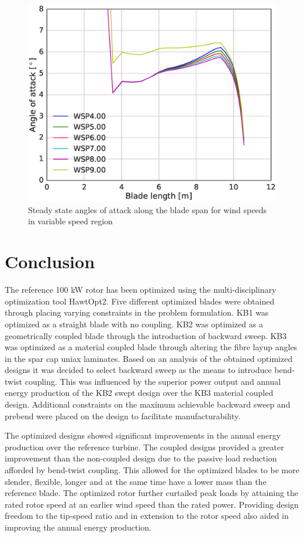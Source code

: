
\begin{figure}[tph]
\centering
\includegraphics[width=0.8\linewidth]{figures/KB6_final/KB5_AoA_WSP_HS2.eps}
\caption{Steady state angles of attack along the blade span for wind speeds in variable speed region}
\label{fig:KB5_aoa}
\end{figure}

\section{Conclusion}
\label{sec:optimize_conc}
The reference 100 kW rotor has been optimized using the multi-disciplinary optimization tool HawtOpt2. Five different optimized blades were obtained through placing varying constraints in the problem formulation. KB1 was optimized as a straight blade with no coupling. KB2 was optimized as a geometrically coupled blade through the introduction of backward sweep. KB3 was optimized as a material coupled blade through altering the fibre layup angles in the spar cap uniax laminates. Based on an analysis of the obtained optimized designs it was decided to select backward sweep as the means to introduce bend-twist coupling. This was influenced by the superior power output and annual energy production of the KB2 swept design over the KB3 material coupled design. Additional constraints on the maximum achievable backward sweep and prebend were placed on the design to facilitate manufacturability.  

The optimized designs showed significant improvements in the annual energy production over the reference turbine. The coupled designs provided a greater improvement than the non-coupled design due to the passive load reduction afforded by bend-twist coupling. This allowed for the optimized blades to be more slender, flexible, longer and at the same time have a lower mass than the reference blade. The optimized rotor further curtailed peak loads by attaining the rated rotor speed at an earlier wind speed than the rated power. Providing design freedom to the tip-speed ratio and in extension to the rotor speed also aided in improving the annual energy production.
